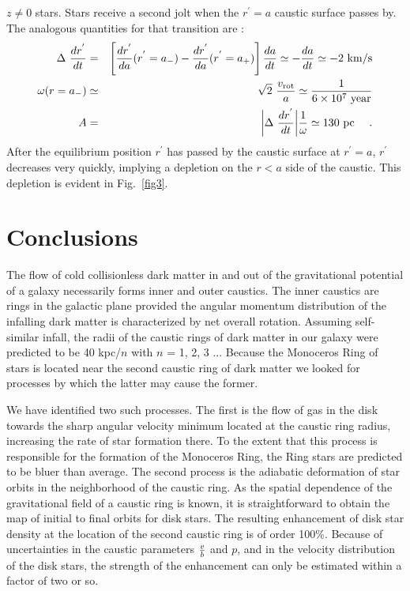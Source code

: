\documentclass[aps,prd,preprint,tightenlines,floatfix,showpacs,groupedaddress]{revtex4}
\begin{document}
{$z \ne 0$ stars. Stars receive a second jolt when the $r^{'} = a$
caustic surface passes by. The analogous quantities for that 
transition are :
\begin{eqnarray}
\Delta~\frac{dr^{'}}{dt} &=& \left[\frac{dr^{'}}{da}(r^{'}= a_-) 
- \frac{dr^{'}}{da}(r^{'}= a_+) \right] \frac{da}{dt} 
\simeq - \frac{da}{dt} \simeq -2~{\rm km/s}\nonumber \\
\omega(r = a_-) &\simeq& \sqrt{2}~\frac{v_{\rm rot}}{a} \simeq
\frac{1}{6 \times 10^7~{\rm year}}\nonumber \\
A &=& \bigg|\Delta~{dr^{'} \over dt} \bigg| \frac{1}{\omega} 
\simeq 130~{\rm pc}~~~\ .
\end{eqnarray}
After the equilibrium position $r^{'}$ has passed by the caustic 
surface at $r^{'}=a$, $r^{'}$ decreases very quickly, implying a 
depletion on the $r < a$ side of the caustic. This depletion is
evident in Fig.~\ref{fig3}.

\section{Conclusions}
 
The flow of cold collisionless dark matter in and out of
the gravitational potential of a galaxy necessarily forms
inner and outer caustics.  The inner caustics are rings in
the galactic plane provided the angular momentum distribution
of the infalling dark matter is characterized by net overall
rotation.  Assuming self-similar infall, the radii of the 
caustic rings of dark matter in our galaxy were predicted
to be  40 kpc/$n$  with $n$ = 1, 2, 3 ...  Because the Monoceros
Ring of stars is located near the second caustic ring of dark 
matter we looked for processes by which the latter may cause 
the former.

We have identified two such processes.  The first is the flow 
of gas in the disk towards the sharp angular velocity minimum 
located at the caustic ring radius, increasing the rate of star 
formation there.  To the extent that this process is responsible
for the formation of the Monoceros Ring, the Ring stars are 
predicted to be bluer than average. The second process is the 
adiabatic deformation of star orbits in the neighborhood of the 
caustic ring.  As the spatial dependence of the gravitational field 
of a caustic ring is known, it is straightforward to obtain the 
map of initial to final orbits for disk stars.  The resulting 
enhancement of disk star density at the location of the second 
caustic ring is of order 100\%.  Because of uncertainties in the 
caustic parameters ${v \over b}$ and $p$, and in the velocity 
distribution of the disk stars, the strength of the enhancement 
can only be estimated within a factor of two or so.

}
\end{document}
